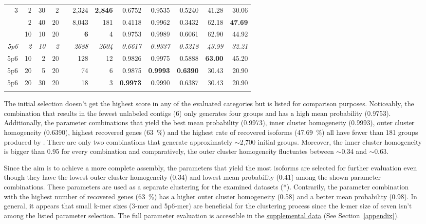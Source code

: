 \documentclass[12pt,a4paper,english]{article}
\begin{document}
\begin{table}[H]
{\begin{tabular}{rrrrrrrrrrrr}
				\midrule
				3 & 2 & 30 & 2 &  & 2,324 & \textbf{2,846} & 0.6752 & 0.9535 & 0.5240 & 41.28 & 30.06 \\ \addlinespace
				3 & 2 & 40 & 20 &  & 8,043 & 181 & 0.4118 & 0.9962 & 0.3432 & 62.18 & \textbf{47.69} \\ \addlinespace
				3 & 10 & 10 & 20 & & \textbf{6} & 4 & 0.9753 & 0.9989 & 0.6061 & 62.90 & 44.92 \\ \addlinespace
				\textit{5p6} & \textit{2} & \textit{10} & \textit{2} & & \textit{2688} & \textit{2604} & \textit{0.6617} & \textit{0.9337} & \textit{0.5218} & \textit{43.99} & \textit{32.21} \\ \addlinespace
				
				5p6 & 10 & 2 & 20 &  & 128 & 12 & 0.9826 & 0.9975 & 0.5888 & \textbf{63.00} & 45.20 \\ \addlinespace
				5p6 & 20 & 5 & 20 &  & 74 & 6 & 0.9875 & \textbf{0.9993} & \textbf{0.6390} & 30.43 & 20.90 \\ \addlinespace
				5p6 & 20 & 30 & 20 &  & 18 & 3 & \textbf{0.9973} & 0.9990 & 0.6387 & 30.43 & 20.90 \\ \addlinespace
				\bottomrule
			\end{tabular}%
		}
	\end{table}
	
    The initial selection doesn't get the highest score in any of the evaluated categories but is listed for comparison purposes.
	Noticeably, the combination that results in the fewest unlabeled contigs (6) only generates four groups and has a high mean probability (0.9753). Additionally, the parameter combinations that yield the best mean probability (0.9973), inner cluster homogeneity (0.9993), outer cluster homogeneity (0.6390), highest recovered genes (63~\%) and the highest rate of recovered isoforms (47.69~\%) all have fewer than 181 groups produced by \hdbscan. There are only two combinations that generate approximately $\sim$2,700 initial groups. Moreover, the inner cluster homogeneity is bigger than 0.95 for every combination and comparatively, the outer cluster homogeneity fluctuates between $\sim$0.34 and $\sim$0.63.
	
	Since the aim is to achieve a more complete assembly, the parameters that yield the most isoforms are selected for further evaluation even though they have the lowest outer cluster homogeneity (0.34) and lowest mean probability (0.41) among the shown parameter combinations. These parameters are used as a separate clustering for the examined datasets (\karma{}*).
	Contrarily, the parameter combination with the highest number of recovered genes (63~\%) has a higher outer cluster homogeneity (0.58) and a better mean probability (0.98).
	In general, it appears that small k-mer sizes (3-mer and 5p6-mer) are beneficial for the clustering process since the k-mer size of seven isn't among the listed parameter selection.
	The full parameter evaluation is accessible in the \href{https://github.com/lmfaber/master_thesis/tree/master/supplemental_data/parameter_evaluation}{supplemental data} (See Section~\ref{appendix}).
\end{document}
